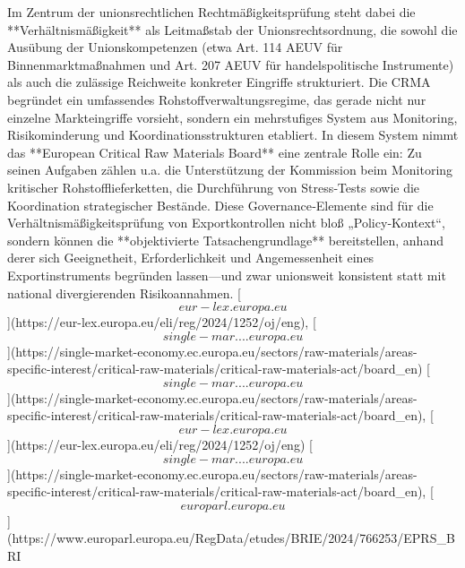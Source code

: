 \documentclass[12pt,a4paper,oneside]{book} %
\begin{document}
Im Zentrum der unionsrechtlichen Rechtmäßigkeitsprüfung steht dabei die **Verhältnismäßigkeit** als Leitmaßstab der Unionsrechtsordnung, die sowohl die Ausübung der Unionskompetenzen (etwa Art. 114 AEUV für Binnenmarktmaßnahmen und Art. 207 AEUV für handelspolitische Instrumente) als auch die zulässige Reichweite konkreter Eingriffe strukturiert. Die CRMA begründet ein umfassendes Rohstoffverwaltungsregime, das gerade nicht nur einzelne Markteingriffe vorsieht, sondern ein mehrstufiges System aus Monitoring, Risikominderung und Koordinationsstrukturen etabliert.  In diesem System nimmt das **European Critical Raw Materials Board** eine zentrale Rolle ein: Zu seinen Aufgaben zählen u.a. die Unterstützung der Kommission beim Monitoring kritischer Rohstofflieferketten, die Durchführung von Stress‑Tests sowie die Koordination strategischer Bestände.  Diese Governance‑Elemente sind für die Verhältnismäßigkeitsprüfung von Exportkontrollen nicht bloß „Policy‑Kontext“, sondern können die **objektivierte Tatsachengrundlage** bereitstellen, anhand derer sich Geeignetheit, Erforderlichkeit und Angemessenheit eines Exportinstruments begründen lassen—und zwar unionsweit konsistent statt mit national divergierenden Risikoannahmen. [\[eur-lex.europa.eu\]](https://eur-lex.europa.eu/eli/reg/2024/1252/oj/eng), [\[single-mar....europa.eu\]](https://single-market-economy.ec.europa.eu/sectors/raw-materials/areas-specific-interest/critical-raw-materials/critical-raw-materials-act/board_en) [\[single-mar....europa.eu\]](https://single-market-economy.ec.europa.eu/sectors/raw-materials/areas-specific-interest/critical-raw-materials/critical-raw-materials-act/board_en), [\[eur-lex.europa.eu\]](https://eur-lex.europa.eu/eli/reg/2024/1252/oj/eng) [\[single-mar....europa.eu\]](https://single-market-economy.ec.europa.eu/sectors/raw-materials/areas-specific-interest/critical-raw-materials/critical-raw-materials-act/board_en), [\[europarl.europa.eu\]](https://www.europarl.europa.eu/RegData/etudes/BRIE/2024/766253/EPRS_BRI%
\end{document}
